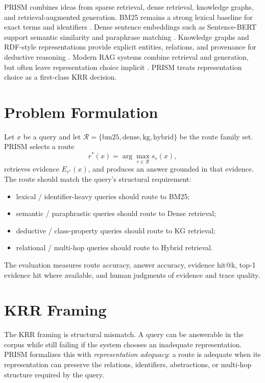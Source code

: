 \documentclass{article}
\begin{document}
PRISM combines ideas from sparse retrieval, dense retrieval, knowledge graphs, and retrieval-augmented generation. BM25 remains a strong lexical baseline for exact terms and identifiers \cite{robertson2009probabilistic}. Dense sentence embeddings such as Sentence-BERT support semantic similarity and paraphrase matching \cite{reimers2019sentence}. Knowledge graphs and RDF-style representations provide explicit entities, relations, and provenance for deductive reasoning \cite{hogan2021knowledge}. Modern RAG systems combine retrieval and generation, but often leave representation choice implicit \cite{lewis2020retrieval}. PRISM treats representation choice as a first-class KRR decision.

\section{Problem Formulation}

Let $x$ be a query and let $\mathcal{R}=\{\text{bm25}, \text{dense}, \text{kg}, \text{hybrid}\}$ be the route family set. PRISM selects a route
\[
    r^*(x) = \arg\max_{r \in \mathcal{R}} s_r(x),
\]
retrieves evidence $E_{r^*}(x)$, and produces an answer grounded in that evidence. The route should match the query's structural requirement:
\begin{itemize}
    \item lexical / identifier-heavy queries should route to BM25;
    \item semantic / paraphrastic queries should route to Dense retrieval;
    \item deductive / class-property queries should route to KG retrieval;
    \item relational / multi-hop queries should route to Hybrid retrieval.
\end{itemize}

The evaluation measures route accuracy, answer accuracy, evidence hit@k, top-1 evidence hit where available, and human judgments of evidence and trace quality.

\section{KRR Framing}

The KRR framing is structural mismatch. A query can be answerable in the corpus while still failing if the system chooses an inadequate representation. PRISM formalizes this with \emph{representation adequacy}: a route is adequate when its representation can preserve the relations, identifiers, abstractions, or multi-hop structure required by the query.
\end{document}
